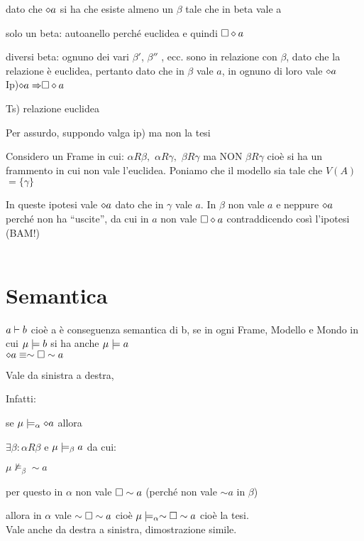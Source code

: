 dato che $\diamond a$ si ha che esiste almeno un $\beta$ tale che in beta
vale a 

solo un beta: autoanello perché euclidea e quindi $\square\diamond a$

diversi beta: ognuno dei vari $\beta'$, $\beta''$ , ecc. sono in
relazione con $\beta$, dato che la relazione è euclidea, pertanto
dato che in $\beta$ vale $a$, in ognuno di loro vale $\diamond a$ \\

Ip)$\diamond{a\Rightarrow}\square\diamond a$ 

Ts) relazione euclidea

Per assurdo, suppondo valga ip) ma non la tesi

Considero un Frame in cui: $\alpha R\beta,$ $\alpha R\gamma,$ $\beta R\gamma$
ma NON $\beta R\gamma$ cioè si ha un frammento in cui non vale l'euclidea.
Poniamo che il modello sia tale che $V(A)$$=\{\gamma\}$

In queste ipotesi vale $\diamond a$ dato che in $\gamma$ vale $a$. In
$\beta$ non vale $a$ e neppure $\diamond a$ perché non ha ``uscite'',
da cui in $a$ non vale $\square\diamond a$ contraddicendo così l'ipotesi
(BAM!) \\\\


\section{Semantica}

$a\vdash b$ cioè a è conseguenza semantica di b, se in ogni Frame,
Modello e Mondo in cui $\mu\models b$ si ha anche $\mu\models a$\\

$\diamond a\equiv\sim\square\sim a$

Vale da sinistra a destra,

Infatti:

se $\mu\models_{\alpha}\diamond a$ allora 

$\exists\beta:$$\alpha R\beta$ e $\mu\models_{\beta}a$ da cui:

$\mu\nvDash_{\beta}\sim a$

per questo in $\alpha$ non vale $\square\sim a$ (perché non vale
$\sim a$ in $\beta$)

allora in $\alpha$ vale $\sim\square\sim a$ cioè $\mu\models_{\alpha}\sim\square\sim a$
cioè la tesi. \\

Vale anche da destra a sinistra, dimostrazione simile.

